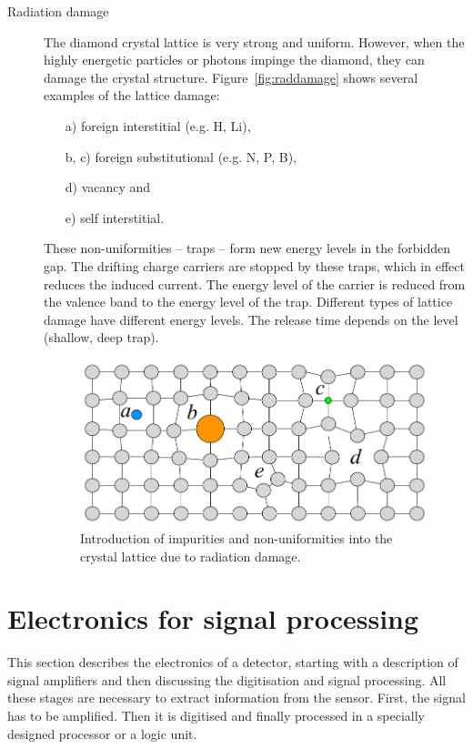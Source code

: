 \documentclass[twoside,12pt]{packages/mytustyle}  %
\begin{document}
\begin{description}
\item[Radiation damage]
The diamond crystal lattice is very strong and uniform. However, when the highly energetic particles or photons impinge the diamond, they can damage the crystal structure. Figure~\ref{fig:raddamage} shows several examples of the lattice damage:
\begin{enumerate}
\item[a)]foreign interstitial (e.g. H, Li),
\item[b, c)]foreign substitutional (e.g. N, P, B),
\item[d)]vacancy and
\item[e)]self interstitial.
\end{enumerate} 
These non-uniformities -- traps -- form new energy levels in the forbidden gap. The drifting charge carriers are stopped by these traps, which in effect reduces the induced current. The energy level of the carrier is reduced from the valence band to the energy level of the trap. Different types of lattice damage have different energy levels. The release time depends on the level (shallow, deep trap).

\begin{figure}[!t]
\begin{center}
\includegraphics[width=0.6\linewidth]{plots/raddamage}
\caption{Introduction of impurities and non-uniformities into the crystal lattice due to radiation damage.}
\label{fig:spcchg}
\end{center}
\end{figure}

\end{description}













\clearpage
\section{Electronics for signal processing} %
\label{sec:elecsigproc}
This section describes the electronics of a detector, starting with a description of signal amplifiers and then discussing the digitisation and signal processing. All these stages are necessary to extract information from the sensor. First, the signal has to be amplified. Then it is digitised and finally processed in a specially designed processor or a logic unit.
\end{document}
